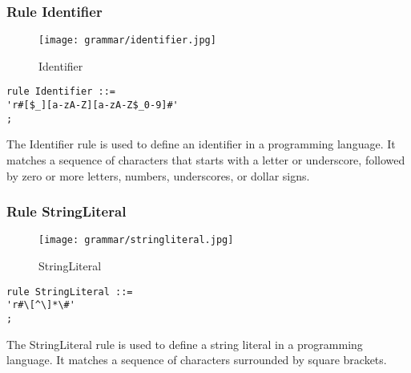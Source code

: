 \subsubsection*{Rule Identifier}

\begin{figure}
  \centering
  \texttt{[image: grammar/identifier.jpg]}
  \caption{Identifier}
  \end{figure}

\begin{lstlisting}
rule Identifier ::=
'r#[$_][a-zA-Z][a-zA-Z$_0-9]#'
;
\end{lstlisting}

The Identifier rule is used to define an identifier in a programming language. It matches a sequence of characters that starts with a letter or underscore, followed by zero or more letters, numbers, underscores, or dollar signs.

\subsubsection*{Rule StringLiteral}

\begin{figure}
  \centering
  \texttt{[image: grammar/stringliteral.jpg]}
  \caption{StringLiteral}
  \end{figure}

\begin{lstlisting}
rule StringLiteral ::=
'r#\[^\]*\#'
;
\end{lstlisting}

The StringLiteral rule is used to define a string literal in a programming language. It matches a sequence of characters surrounded by square brackets.
